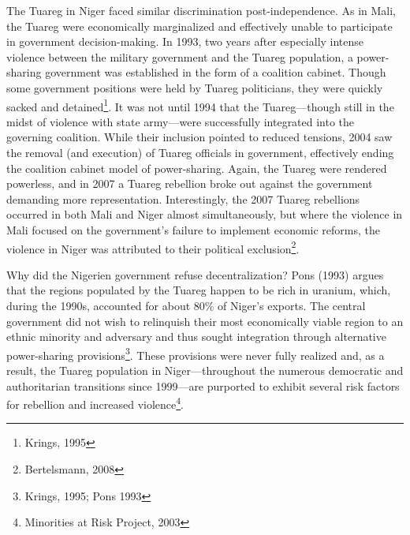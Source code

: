 \documentclass[12pt]{article}
\begin{document}
The Tuareg in Niger faced similar discrimination post-independence. As in Mali, the Tuareg were economically marginalized and effectively unable to participate in government decision-making. In 1993, two years after especially intense violence between the military government and the Tuareg population, a power-sharing government was established in the form of a coalition cabinet. Though some government positions were held by Tuareg politicians, they were quickly sacked and detained\footnote{Krings, 1995}. It was not until 1994 that the Tuareg---though still in the midst of violence with state army---were successfully integrated into the governing coalition. While their inclusion pointed to reduced tensions, 2004 saw the removal (and execution) of Tuareg officials in government, effectively ending the coalition cabinet model of power-sharing. Again, the Tuareg were rendered powerless, and in 2007 a Tuareg rebellion broke out against the government demanding more representation. Interestingly, the 2007 Tuareg rebellions occurred in both Mali and Niger almost simultaneously, but where the violence in Mali focused on the government's failure to implement economic reforms, the violence in Niger was attributed to their political exclusion\footnote{Bertelsmann, 2008}. 

Why did the Nigerien government refuse decentralization? Pons (1993) argues that the regions populated by the Tuareg happen to be rich in uranium, which, during the 1990s, accounted for about 80\% of Niger's exports. The central government did not wish to relinquish their most economically viable region to an ethnic minority and adversary and thus sought integration through alternative power-sharing provisions\footnote{Krings, 1995; Pons 1993}. These provisions were never fully realized and, as a result, the Tuareg population in Niger---throughout the numerous democratic and authoritarian transitions since 1999---are purported to exhibit several risk factors for rebellion and increased violence\footnote{Minorities at Risk Project, 2003}. 
\end{document}
